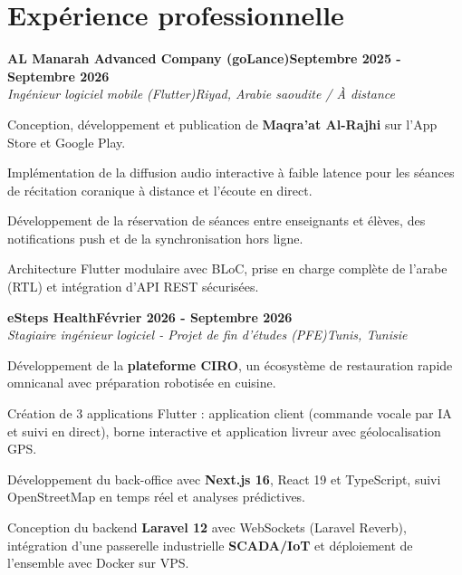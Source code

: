 \documentclass[letterpaper,10pt]{article}
\newcommand{\heading}[2]{\hspace{10pt}#1\hfill#2\\}
\newcommand{\headingBf}[2]{\heading{\textbf{#1}}{\textbf{#2}}}
\newcommand{\headingIt}[2]{\heading{\textit{#1}}{\textit{#2}}}
\newenvironment{resume_list}{
  \vspace{-7pt}
  \begin{itemize}[itemsep=-2pt, parsep=1pt, leftmargin=30pt]
}{
  \end{itemize}
}
\begin{document}
\section{Expérience professionnelle}

\headingBf{AL Manarah Advanced Company (goLance)}{Septembre 2025 - Septembre 2026}

\headingIt{Ingénieur logiciel mobile (Flutter)}{Riyad, Arabie saoudite / À distance}

\begin{resume_list}

  \item Conception, développement et publication de \textbf{Maqra'at Al-Rajhi} sur l'App Store et Google Play.

  \item Implémentation de la diffusion audio interactive à faible latence pour les séances de récitation coranique à distance et l'écoute en direct.

  \item Développement de la réservation de séances entre enseignants et élèves, des notifications push et de la synchronisation hors ligne.

  \item Architecture Flutter modulaire avec BLoC, prise en charge complète de l'arabe (RTL) et intégration d'API REST sécurisées.

\end{resume_list}

\headingBf{eSteps Health}{Février 2026 - Septembre 2026}

\headingIt{Stagiaire ingénieur logiciel - Projet de fin d'études (PFE)}{Tunis, Tunisie}

\begin{resume_list}

  \item Développement de la \textbf{plateforme CIRO}, un écosystème de restauration rapide omnicanal avec préparation robotisée en cuisine.

  \item Création de 3 applications Flutter : application client (commande vocale par IA et suivi en direct), borne interactive et application livreur avec géolocalisation GPS.

  \item Développement du back-office avec \textbf{Next.js 16}, React 19 et TypeScript, suivi OpenStreetMap en temps réel et analyses prédictives.

  \item Conception du backend \textbf{Laravel 12} avec WebSockets (Laravel Reverb), intégration d'une passerelle industrielle \textbf{SCADA/IoT} et déploiement de l'ensemble avec Docker sur VPS.

\end{resume_list}
\end{document}

